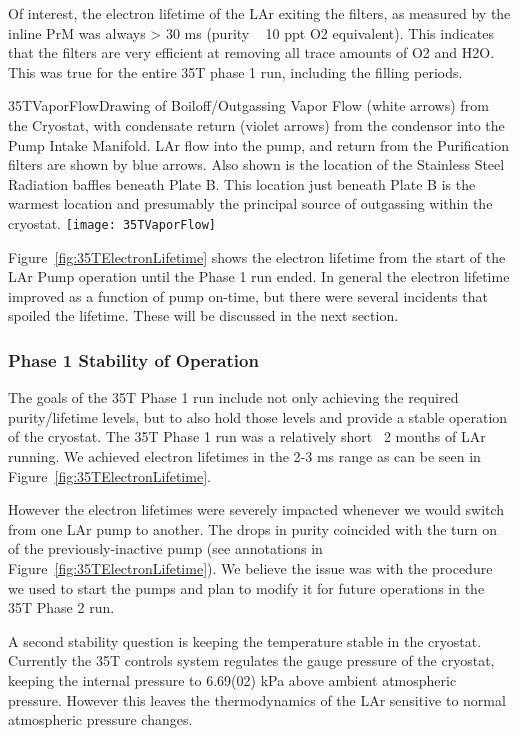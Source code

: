Of interest, the electron lifetime of the LAr exiting the filters, as measured by the inline PrM was always  
> 30 ms (purity ~ 10 ppt O2 equivalent). This indicates that the filters are very efficient at removing all 
trace amounts of O2 and H2O. This was true for the entire 35T phase 1 run, including the filling periods.

\begin{cdrfigure}{35TVaporFlow}{Drawing of Boiloff/Outgassing Vapor Flow (white 
arrows) from the Cryostat, with condensate return (violet arrows) from the condensor into the Pump 
Intake Manifold. LAr flow into the pump, and return from the Purification filters are shown by blue 
arrows. Also shown is the location of the Stainless Steel Radiation baffles beneath Plate B. This location 
just beneath Plate B is the warmest location and presumably the principal source of outgassing within the 
cryostat.}
  \texttt{[image: 35TVaporFlow]}
\end{cdrfigure}

Figure~\ref{fig:35TElectronLifetime} shows the electron lifetime from the start of the LAr Pump operation until the Phase 1 run ended. In general the electron lifetime improved as a function of pump on-time, but there were several incidents that spoiled the lifetime. These will be discussed in the next section.

\subsubsection {Phase 1 Stability of Operation}

The goals of the 35T Phase 1 run include not only achieving the required purity/lifetime levels, but to 
also hold those levels and provide a stable operation of the cryostat. The 35T Phase 1 run was a relatively 
short  ~2 months of LAr running. We achieved electron lifetimes in the 2-3 ms range as can be seen in 
Figure~\ref{fig:35TElectronLifetime}.

However the electron lifetimes were severely impacted whenever we would switch from one LAr pump to 
another. The drops in purity coincided with the turn on of the previously-inactive pump (see annotations 
in Figure~\ref{fig:35TElectronLifetime}). We believe the issue was with the procedure we used to start the 
pumps and plan to modify it for future operations in the 35T Phase 2 run.

A second stability question is keeping the temperature stable in the cryostat. Currently the 35T controls 
system regulates the gauge pressure of the cryostat, keeping the internal pressure to 6.69(02) kPa above 
ambient atmospheric pressure. However this leaves the thermodynamics of the LAr sensitive to normal 
atmospheric pressure changes.

